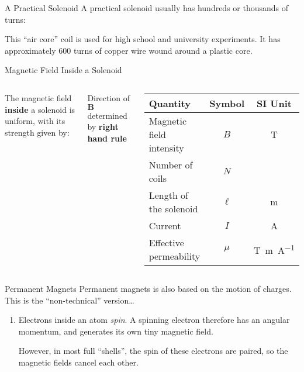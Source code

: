 \documentclass[12pt,aspectratio=169]{beamer}
\begin{document}
\begin{frame}{A Practical Solenoid}
  A practical solenoid usually has hundreds or thousands of turns:
  \begin{center}
  \end{center}

  \vspace{-.2in}
  This ``air core'' coil is used for high school and university experiments. It
  has approximately 600 turns of copper wire wound around a plastic core.
\end{frame}

\begin{frame}{Magnetic Field Inside a Solenoid}
  \begin{columns}
    
    The magnetic field \textbf{inside} a solenoid is uniform, with its strength
    given by:
    
    
    Direction of $\bm{B}$ determined by \textbf{right hand rule}
    \begin{center}
      \begin{tabular}{l|c|c}
        \rowcolor{pink}
        \textbf{Quantity} & \textbf{Symbol} & \textbf{SI Unit} \\ \hline
        Magnetic field intensity & $B$    & \si{\tesla} \\
        Number of coils          & $N$    & \\
        Length of the solenoid   & $\ell$ & \si{\metre}\\
        Current                  & $I$    & \si{\ampere}\\
        Effective permeability   & $\mu$  & \si{\tesla\metre\per\ampere}
      \end{tabular}
    \end{center}
  \end{columns}
\end{frame}



\begin{frame}{Permanent Magnets}
  Permanent magnets is also based on the motion of charges. This is the
  ``non-technical'' version\ldots

  \begin{enumerate}
  \item Electrons inside an atom \emph{spin}. A spinning electron therefore has
    an angular momentum, and generates its own tiny magnetic field.
    \begin{center}
    \end{center}
    However, in most full ``shells'', the spin of these electrons are paired,
    so the magnetic fields cancel each other.
  \end{enumerate}
\end{frame}
\end{document}
